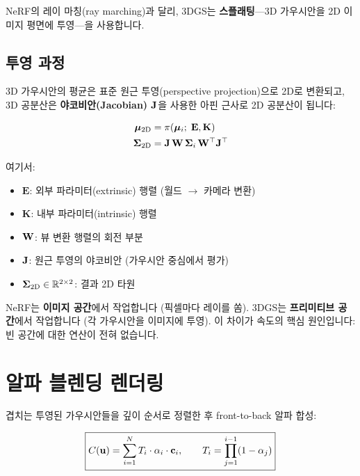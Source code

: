 \documentclass[11pt, a4paper]{report}
\begin{document}
NeRF의 레이 마칭(ray marching)과 달리, 3DGS는 \textbf{스플래팅}---3D 가우시안을 2D 이미지 평면에 투영---을 사용합니다.

\subsection{투영 과정}

3D 가우시안의 평균은 표준 원근 투영(perspective projection)으로 2D로 변환되고, 3D 공분산은 \textbf{야코비안(Jacobian) $\mathbf{J}$}을 사용한 아핀 근사로 2D 공분산이 됩니다:

\begin{align}
\bm{\mu}_{\text{2D}} &= \pi(\bm{\mu}_i;\; \mathbf{E}, \mathbf{K}) \label{eq:mean_proj} \\
\bm{\Sigma}_{\text{2D}} &= \mathbf{J} \, \mathbf{W} \, \bm{\Sigma}_i \, \mathbf{W}^\top \mathbf{J}^\top \label{eq:cov_proj}
\end{align}

여기서:
\begin{itemize}[leftmargin=*]
  \item $\mathbf{E}$: 외부 파라미터(extrinsic) 행렬 (월드 $\rightarrow$ 카메라 변환)
  \item $\mathbf{K}$: 내부 파라미터(intrinsic) 행렬
  \item $\mathbf{W}$: 뷰 변환 행렬의 회전 부분
  \item $\mathbf{J}$: 원근 투영의 야코비안 (가우시안 중심에서 평가)
  \item $\bm{\Sigma}_{\text{2D}} \in \mathbb{R}^{2\times 2}$: 결과 2D 타원
\end{itemize}

\begin{importantnote}
NeRF는 \textbf{이미지 공간}에서 작업합니다 (픽셀마다 레이를 쏨). 3DGS는 \textbf{프리미티브 공간}에서 작업합니다 (각 가우시안을 이미지에 투영). 이 차이가 속도의 핵심 원인입니다: 빈 공간에 대한 연산이 전혀 없습니다.
\end{importantnote}


\section{알파 블렌딩 렌더링}
\label{sec:alpha_blending}

겹치는 투영된 가우시안들을 깊이 순서로 정렬한 후 front-to-back 알파 합성:

\begin{equation}
\boxed{
C(\mathbf{u}) = \sum_{i=1}^{N} T_i \cdot \alpha_i \cdot \mathbf{c}_i, \qquad T_i = \prod_{j=1}^{i-1}(1 - \alpha_j)
}
\label{eq:3dgs_rendering}
\end{equation}
\end{document}
